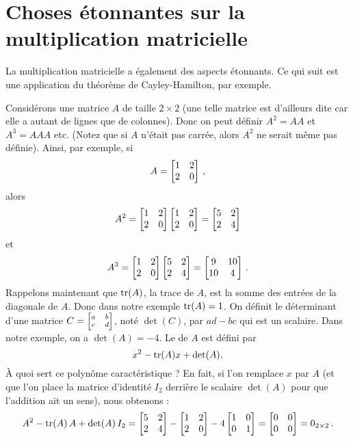 

\section{Choses étonnantes sur la multiplication matricielle}

La multiplication matricielle a également des aspects étonnants.  Ce qui suit est une application du théorème de Cayley-Hamilton,
par exemple.

  
Considérons une matrice $A$ de taille $2\times 2$ (une telle 
matrice est d'ailleurs dite  car elle a autant de lignes que de colonnes). Donc on peut définir $A^2=AA$ et  $A^3 = AAA$ etc. (Notez que si $A$ n'était pas carrée, alors $A^2$ ne serait même pas définie).
Ainsi, par exemple, si 
$$
A = \left[ \begin{matrix} 1 & 2 \\ 2&0 \end{matrix} \right]\,,
$$
alors 
$$A^2 =  \left[ \begin{matrix} 1 & 2 \\ 2&0 \end{matrix} \right] \left[ \begin{matrix} 1 & 2 \\ 2&0 \end{matrix} \right] = \left[ \begin{matrix} 5&2\\2&4 \end{matrix} \right]
$$
et
$$
A^3 = \left[ \begin{matrix} 1 & 2 \\ 2&0 \end{matrix} \right]\left[ \begin{matrix} 5&2\\2&4 \end{matrix} \right] = \left[ \begin{matrix} 9&10\\10&4 \end{matrix} \right]\,.
$$
Rappelons maintenant que $\operatorname{ tr}(A)$, la trace de $A$, est la somme des entrées de la diagonale de $A$.  Donc dans notre exemple $\operatorname{ tr}(A) = 1$.  On d\'efinit le d\'eterminant d'une matrice $C=\scriptsize\left[ \begin{matrix} a&b\\c&d \end{matrix} \right]$, not\'e $\det(C)$, par $ad-bc$ qui est un scalaire. Dans notre exemple, on a  $\det(A)=-4$.  Le 
 de $A$ est d\'efini par
$$
x^2 - \operatorname{ tr}(A)x + \det(A).
$$
À quoi sert ce polynôme caractéristique ? En fait, si l'on remplace $x$ par $A$ (et que l'on place la matrice d'identité $I_2$ derrière le scalaire $\det(A)$ pour que l'addition ait un sens), nous obtenons :
$$
A^2 - \operatorname{ tr}(A) \,A + \det(A)\, I_2 = \left[ \begin{matrix} 5&2\\2&4 \end{matrix} \right] -  \left[ \begin{matrix} 1 & 2 \\ 2&0 \end{matrix} \right] - 4\left[ \begin{matrix} 1&0\\0&1 \end{matrix} \right] = \left[ \begin{matrix} 0&0\\0&0 \end{matrix} \right] = 0_{2\times 2}\,.
$$
 
